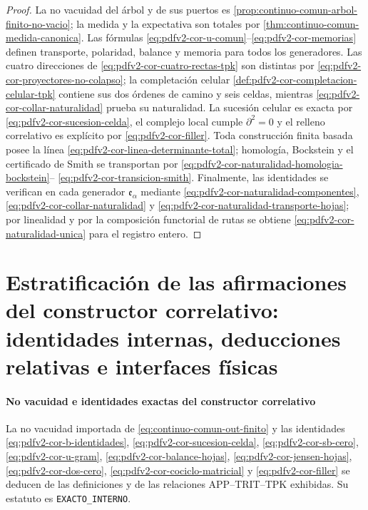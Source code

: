\begin{proof}
La no vacuidad del árbol y de sus puertos es
\cref{prop:continuo-comun-arbol-finito-no-vacio}; la medida y la expectativa
son totales por \cref{thm:continuo-comun-medida-canonica}. Las fórmulas
  \eqref{eq:pdfv2-cor-u-comun}--\eqref{eq:pdfv2-cor-memorias} definen transporte,
polaridad, balance y memoria para todos los generadores. Las cuatro
  direcciones de \eqref{eq:pdfv2-cor-cuatro-rectas-tpk} son distintas por
  \eqref{eq:pdfv2-cor-proyectores-no-colapso}; la completación celular
  \cref{def:pdfv2-cor-completacion-celular-tpk} contiene sus dos órdenes de
  camino y seis celdas, mientras
  \eqref{eq:pdfv2-cor-collar-naturalidad} prueba su naturalidad. La
sucesión celular es exacta por \eqref{eq:pdfv2-cor-sucesion-celda}, el
complejo local cumple \(\partial^2=0\) y el relleno correlativo es explícito por
\eqref{eq:pdfv2-cor-filler}. Toda construcción finita basada posee la línea
\eqref{eq:pdfv2-cor-linea-determinante-total}; homología, Bockstein y el
certificado de Smith se transportan por
\eqref{eq:pdfv2-cor-naturalidad-homologia-bockstein}--
\eqref{eq:pdfv2-cor-transicion-smith}. Finalmente, las identidades se
verifican en cada generador \(\mathfrak e_\alpha\) mediante
\eqref{eq:pdfv2-cor-naturalidad-componentes},
\eqref{eq:pdfv2-cor-collar-naturalidad} y
\eqref{eq:pdfv2-cor-naturalidad-transporte-hojas}; por linealidad y por la
composición functorial de rutas se obtiene
\eqref{eq:pdfv2-cor-naturalidad-unica} para el registro entero.
\end{proof}

\section{Estratificación de las afirmaciones del constructor correlativo: identidades internas, deducciones relativas e interfaces físicas}

\paragraph{No vacuidad e identidades exactas del constructor correlativo}
La no vacuidad importada de \eqref{eq:continuo-comun-out-finito} y las
identidades
\eqref{eq:pdfv2-cor-b-identidades},
\eqref{eq:pdfv2-cor-sucesion-celda},
\eqref{eq:pdfv2-cor-sb-cero},
\eqref{eq:pdfv2-cor-u-gram},
\eqref{eq:pdfv2-cor-balance-hojas},
\eqref{eq:pdfv2-cor-jensen-hojas},
\eqref{eq:pdfv2-cor-dos-cero},
\eqref{eq:pdfv2-cor-cociclo-matricial} y
\eqref{eq:pdfv2-cor-filler} se deducen de las definiciones y de las relaciones
APP--TRIT--TPK exhibidas. Su estatuto es
\texttt{EXACTO\_INTERNO}.

